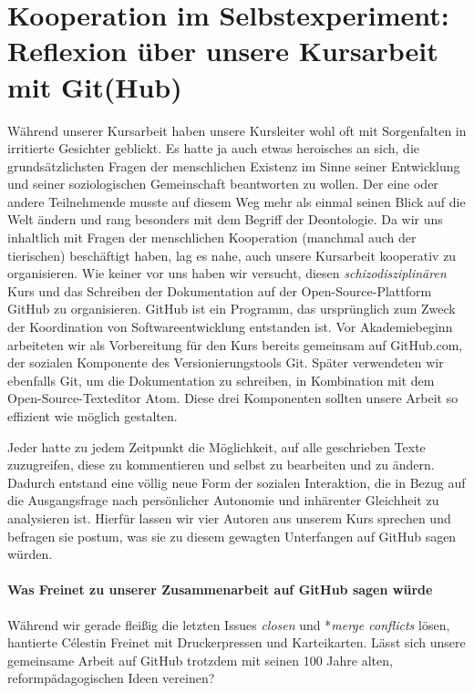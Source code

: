 \section[Kursreflexion]{Kooperation im Selbstexperiment: Reflexion über unsere Kursarbeit mit Git(Hub)}

Während unserer Kursarbeit haben unsere Kursleiter wohl oft mit Sorgenfalten in irritierte Gesichter geblickt.
Es hatte ja auch etwas heroisches an sich, die grundsätzlichsten Fragen der menschlichen Existenz im Sinne seiner Entwicklung und seiner soziologischen Gemeinschaft beantworten zu wollen.
Der eine oder andere Teilnehmende musste auf diesem Weg mehr als einmal seinen Blick auf die Welt ändern und rang besonders mit dem Begriff der Deontologie.
Da wir uns inhaltlich mit Fragen der menschlichen Kooperation (manchmal auch der tierischen) beschäftigt haben, lag es nahe, auch unsere Kursarbeit kooperativ zu organisieren.
Wie keiner vor uns haben wir versucht, diesen \emph{schizodisziplinären} Kurs und das Schreiben der Dokumentation auf der Open-Source-Plattform GitHub zu organisieren.
GitHub ist ein Programm, das ursprünglich zum Zweck der Koordination von Softwareentwicklung entstanden ist.
Vor Akademiebeginn arbeiteten wir als Vorbereitung für den Kurs bereits gemeinsam auf GitHub.com, der sozialen Komponente des Versionierungstools Git.
Später verwendeten wir ebenfalls Git, um die Dokumentation zu schreiben, in Kombination mit dem Open-Source-Texteditor Atom.
Diese drei Komponenten sollten unsere Arbeit so effizient wie möglich gestalten.

Jeder hatte zu jedem Zeitpunkt die Möglichkeit, auf alle geschrieben Texte zuzugreifen, diese zu kommentieren und selbst zu bearbeiten und zu ändern.
Dadurch entstand eine völlig neue Form der sozialen Interaktion, die in Bezug auf die Ausgangsfrage nach persönlicher Autonomie und inhärenter Gleichheit zu analysieren ist.
Hierfür lassen wir vier Autoren aus unserem Kurs sprechen und befragen sie postum, was sie zu diesem gewagten Unterfangen auf GitHub sagen würden.


\paragraph{Was Freinet zu unserer Zusammenarbeit auf GitHub sagen würde}

Während wir gerade fleißig die letzten Issues \emph{closen} und *\emph{merge conflicts} lösen, hantierte Célestin Freinet mit Druckerpressen und Karteikarten.
Lässt sich unsere gemeinsame Arbeit auf GitHub trotzdem mit seinen 100 Jahre alten, reformpädagogischen Ideen vereinen?


